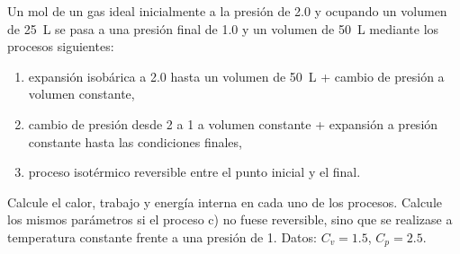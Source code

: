 Un mol de un gas ideal inicialmente a la presión de \SI{2,0}{\atm} y ocupando un volumen de \SI{25}{\liter} se pasa a una presión final de \SI{1,0}{\atm} y un volumen de \SI{50}{\liter} mediante los procesos siguientes:
	\begin{enumerate}[label={\alph*)},font=\bfseries]
		\item expansión isobárica a \SI{2,0}{\atm} hasta un volumen de \SI{50}{\liter} + cambio de presión a volumen constante,
		\item cambio de presión desde \num{2} a \SI{1}{\atm} a volumen constante + expansión a presión constante hasta las condiciones finales,
		\item proceso isotérmico reversible entre el punto inicial y el final.
	\end{enumerate}
	Calcule el calor, trabajo y energía interna en cada uno de los procesos. Calcule los mismos parámetros si el proceso c) no fuese reversible, sino que se realizase a temperatura constante frente a una presión de \SI{1}{\atm}. Datos: $C_v = \num{1,5}$, $C_p = \num{2,5}$.
